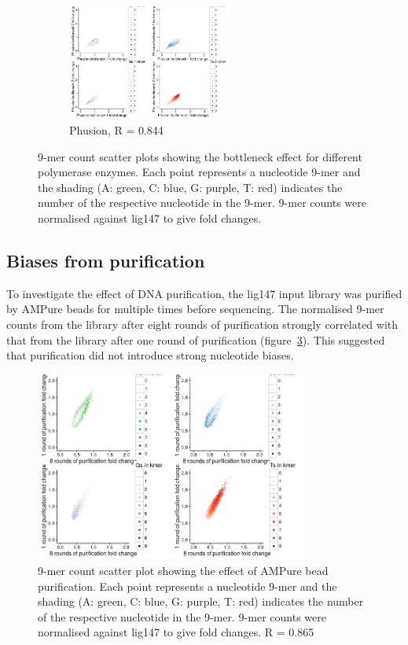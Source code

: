 \documentclass[parskip=full, numbers=noenddot]{scrbook}
\begin{document}
\begin{figure}[htbp]
\begin{subfigure}[htbp]{0.6\textwidth}
    \centering
    \includegraphics[width=0.6\textwidth]{kmer_phusionBN}
    \caption{Phusion, R = 0.844}
    \label{fig:kmer_bn_phusion}
  \end{subfigure}
  \caption{9-mer count scatter plots showing the bottleneck effect for different polymerase enzymes.  Each point represents a nucleotide 9-mer and the shading (A: green, C: blue, G: purple, T: red) indicates the number of the respective nucleotide in the 9-mer.  9-mer counts were normalised against lig147 to give fold changes.}
  \label{fig:kmer_bn}
\end{figure}

\subsection{Biases from purification}
\label{ssec:pcrbias_result_pur}

To investigate the effect of DNA purification, the lig147 input library was purified by AMPure beads for multiple times before sequencing.  The normalised 9-mer counts from the library after eight rounds of purification strongly correlated with that from the library after one round of purification (figure~\ref{fig:kmer_pur}).  This suggested that purification did not introduce strong nucleotide biases.

\begin{figure}[htbp]
  \centering
  \includegraphics[width=0.8\textwidth]{kmer_ampure}
  \caption{9-mer count scatter plot showing the effect of AMPure bead purification.  Each point represents a nucleotide 9-mer and the shading (A: green, C: blue, G: purple, T: red) indicates the number of the respective nucleotide in the 9-mer.  9-mer counts were normalised against lig147 to give fold changes.  R = 0.865}
  \label{fig:kmer_pur}
\end{figure}
\end{document}
